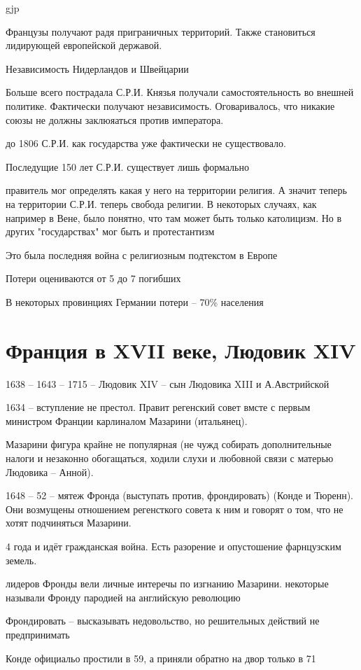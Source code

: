 gjp	 \documentclass[12pt,a4paper]{article}
\begin{document}
Французы получают радя приграничных территорий. Также становиться лидирующей европейской державой.

Независимость Нидерландов и Швейцарии

Больше всего пострадала С.Р.И. Князья получали самостоятельность во внешней политике. Фактически получают независимость. Оговаривалось, что никакие союзы не должны заклюяаться против императора. 

до 1806 С.Р.И. как государства уже фактически не существовало.

Последущие 150 лет С.Р.И. существует лишь формально

правитель мог определять какая у него на территории религия. А значит теперь на территории С.Р.И. теперь свобода религии. В некоторых случаях, как например в Вене, было понятно, что там может быть только католицизм. Но в других "государствах" мог быть и протестантизм

Это была последняя война с религиозным подтекстом  в Европе


Потери оцениваются от 5 до 7 погибших

В некоторых провинциях Германии потери -- 70\% населения

\section{Франция в XVII веке, Людовик XIV}

1638 -- 1643 -- 1715 -- Людовик XIV -- сын Людовика XIII и А.Австрийской

1634 -- вступление не престол. Правит регенский совет вмсте с первым министром Франции карлиналом Мазарини (итальянец).

Мазарини фигура крайне не популярная (не чужд собирать дополнительные налоги и незаконно обогащаться, ходили слухи и любовной связи с матерью Людовика -- Анной).

1648 -- 52 -- мятеж Фронда (выступать против, фрондировать) (Конде и Тюренн). Они возмущены отношением регенсткого совета к ним и говорят о том, что не хотят подчиняться Мазарини.

4 года и идёт гражданская война. Есть разорение и опустошение фарнцузским земель.

лидеров Фронды вели личные интеречы по изгнанию Мазарини. некоторые называли Фронду пародией на английскую революцию

Фрондировать -- высказывать недовольство, но решительных действий не предпринимать

Конде официальо простили в 59, а приняли обратно на двор только в 71
\end{document}
